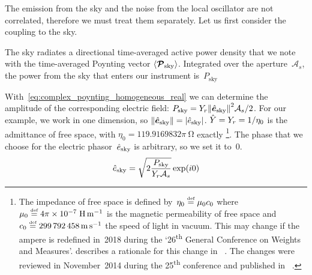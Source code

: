 The emission from the sky and the noise from the local oscillator are not correlated, therefore we must treat them separately.
Let us first consider the coupling to the sky.

The sky radiates a directional time-averaged active power density
that we note with the time-averaged Poynting vector
$\langle \bm{\mathcal{P}}_\text{sky} \rangle$.
Integrated over the aperture~$\mathcal{A}_s$, the power from the sky that enters our instrument is~$P_\text{sky}$

With~\cref{eq:complex_poynting_homogeneous_real} we can determine the amplitude of the corresponding electric field:
$P_\text{sky} = Y_r \norm{\vectcp{e}_\text{sky}}^2 \mathcal{A}_s / 2$.
For our example, we work in one dimension, so
$\norm{\vectcp{e}_\text{sky}} = \abs{\cp{e}_\text{sky}}$.
$\hat{Y}=Y_r=1/\eta_0$ is the admittance of free space, with $\eta_0 = 119.9169832\pi~\si{\ohm}$ exactly%
\footnote{
    The impedance of free space is defined by~$\eta_0 \stackrel{\text{\tiny def}}{=} \mu_0 c_0$ where
    $\mu_0 \equaldef 4\pi\times10^{-7}\;\si{\henry\per\meter}$
    is the magnetic permeability of free space and
    $c_0 \stackrel{\text{\tiny def}}{=} \SI{299792458}{\meter\per\second}$
    the speed of light in vacuum.
    This may change if the ampere is redefined in~2018 during the
    `26\textsuperscript{th} General Conference on Weights and Measures'.
    \citeauthor{mills2006redefinition} describes a rationale for this change
    in ~\cite{mills2006redefinition}.
    The changes were reviewed in November~2014 during the 25\textsuperscript{th} conference and published in ~\cite{resolutioncgpm2014}.
}.
The phase that we choose for the electric phasor~$\hat{e}_\text{sky}$ is arbitrary, so we set it to~0.
\begin{equation}
    \hat{e}_\text{sky} = \sqrt{
        2
        \frac{P_\text{sky}}{Y_r \mathcal{A}_s}
    } \exp(i0)
\end{equation}

